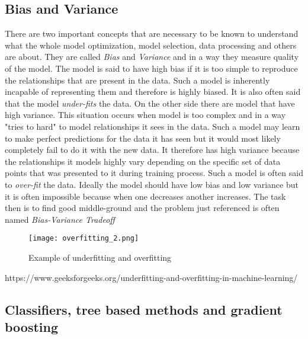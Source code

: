 \documentclass[a4paper,twoside,12pt]{book}
\begin{document}
\subsection{Bias and Variance}

There are two important concepts that are necessary to be known to understand what the whole model optimization, model selection, data processing and others are about. They are called \emph{Bias} and \emph{Variance} and in a way they measure quality of the model.
The model is said to have high bias if it is too simple to reproduce the relationships that are present in the data. Such a model is inherently incapable of representing them and therefore is highly biased. It is also often said that the model \emph{under-fits} the data. On the other side there are model that have high variance. This situation occurs when model is too complex and in a way "tries to hard" to model relationships it sees in the data. Such a model may learn to make perfect predictions for the data it has seen but it would most likely completely fail to do it with the new data. It therefore has high variance because the relationships it models highly vary depending on the specific set of data points that was presented to it during training process. Such a model is often said to \emph{over-fit} the data.
Ideally the model should have low bias and low variance but it is often impossible because when one decreases another increases. The task then is to find good middle-ground and the problem just referenced is often named \emph{Bias-Variance Tradeoff}

\begin{figure}[h]
    \centering
    \texttt{[image: overfitting\_2.png]}
    \caption{Example of underfitting and overfitting}
    \label{fig:mesh1}
\end{figure}

https://www.geeksforgeeks.org/underfitting-and-overfitting-in-machine-learning/

\subsection{Classifiers, tree based methods and gradient boosting}
\end{document}
